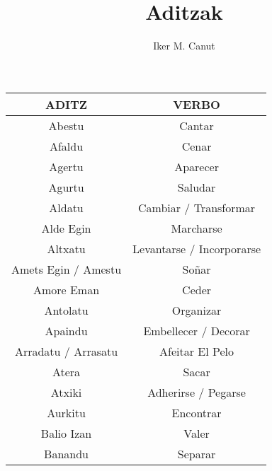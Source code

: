 \documentclass[11pt, a4paper]{article}
\begin{document}
\author{Iker M. Canut}
\date{}
\title{Aditzak\\}

\centering
\begin{longtable}{cc}
    \hline
    \textbf{ADITZ}                & \textbf{VERBO}                 \\
    \hline
    \hline
    Abestu                        & Cantar                         \\
    \hline
    Afaldu                        & Cenar                          \\
    \hline
    Agertu                        & Aparecer                       \\
    \hline
    Agurtu                        & Saludar                        \\
    \hline
    Aldatu                        & Cambiar / Transformar          \\
    \hline
    Alde Egin                     & Marcharse                      \\
    \hline
    Altxatu                       & Levantarse / Incorporarse      \\
    \hline
    Amets Egin / Amestu           & Soñar                          \\
    \hline
    Amore Eman                    & Ceder                          \\
    \hline
    Antolatu                      & Organizar                      \\
    \hline
    Apaindu                       & Embellecer / Decorar           \\
    \hline
    Arradatu / Arrasatu           & Afeitar El Pelo                \\
    \hline
    Atera                         & Sacar                          \\
    \hline
    Atxiki                        & Adherirse / Pegarse            \\
    \hline
    Aurkitu                       & Encontrar                      \\
    \hline
    Balio Izan                    & Valer                          \\
    \hline
    Banandu                       & Separar                        \\
    \hline

\end{longtable}
\end{document}
